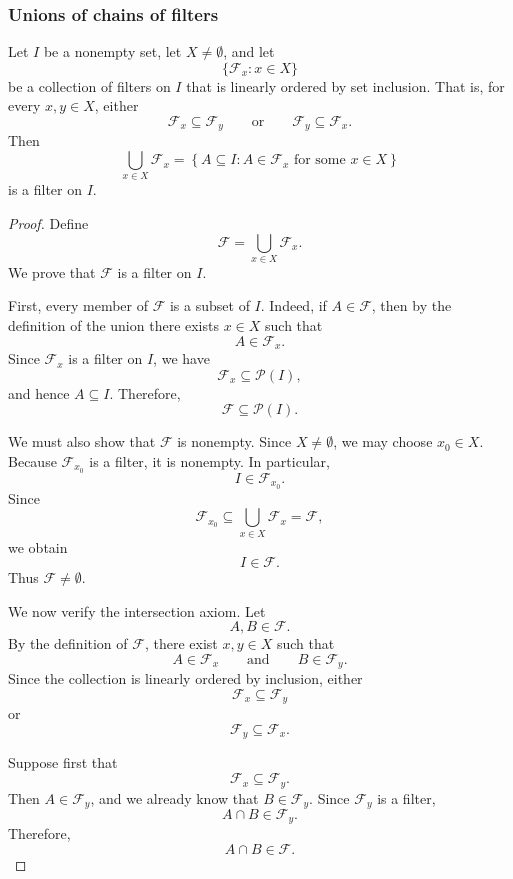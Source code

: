 {\subsubsection{Unions of chains of filters}
\begin{prop} \label{prop:union of a linearly ordered collection of filters is a filter}
Let \(I\) be a nonempty set, let \(X\neq\emptyset\), and let
\[
\{\mathcal{F}_x : x\in X\}
\]
be a collection of filters on \(I\) that is linearly ordered by set
inclusion. That is, for every \(x,y\in X\), either
\[
\mathcal{F}_x\subseteq\mathcal{F}_y
\qquad\text{or}\qquad
\mathcal{F}_y\subseteq\mathcal{F}_x.
\]
Then
\[
\bigcup_{x\in X}\mathcal{F}_x
=
\left\{
A\subseteq I :
A\in\mathcal{F}_x
\text{ for some }x\in X
\right\}
\]
is a filter on \(I\).
\end{prop}

\begin{proof}
Define
\[
\mathcal{F}
=
\bigcup_{x\in X}\mathcal{F}_x.
\]
We prove that \(\mathcal{F}\) is a filter on \(I\).

First, every member of \(\mathcal{F}\) is a subset of \(I\). Indeed, if
\(A\in\mathcal{F}\), then by the definition of the union there exists
\(x\in X\) such that
\[
A\in\mathcal{F}_x.
\]
Since \(\mathcal{F}_x\) is a filter on \(I\), we have
\[
\mathcal{F}_x\subseteq\mathcal{P}(I),
\]
and hence \(A\subseteq I\). Therefore,
\[
\mathcal{F}\subseteq\mathcal{P}(I).
\]

We must also show that \(\mathcal{F}\) is nonempty. Since \(X\neq\emptyset\),
we may choose \(x_0\in X\). Because \(\mathcal{F}_{x_0}\) is a filter, it is
nonempty. In particular,
\[
I\in\mathcal{F}_{x_0}.
\]
Since
\[
\mathcal{F}_{x_0}\subseteq
\bigcup_{x\in X}\mathcal{F}_x
=
\mathcal{F},
\]
we obtain
\[
I\in\mathcal{F}.
\]
Thus \(\mathcal{F}\neq\emptyset\).

We now verify the intersection axiom. Let
\[
A,B\in\mathcal{F}.
\]
By the definition of \(\mathcal{F}\), there exist \(x,y\in X\) such that
\[
A\in\mathcal{F}_x
\qquad\text{and}\qquad
B\in\mathcal{F}_y.
\]
Since the collection is linearly ordered by inclusion, either
\[
\mathcal{F}_x\subseteq\mathcal{F}_y
\]
or
\[
\mathcal{F}_y\subseteq\mathcal{F}_x.
\]

Suppose first that
\[
\mathcal{F}_x\subseteq\mathcal{F}_y.
\]
Then \(A\in\mathcal{F}_y\), and we already know that
\(B\in\mathcal{F}_y\). Since \(\mathcal{F}_y\) is a filter,
\[
A\cap B\in\mathcal{F}_y.
\]
Therefore,
\[
A\cap B\in\mathcal{F}.
\]


\end{proof}}
